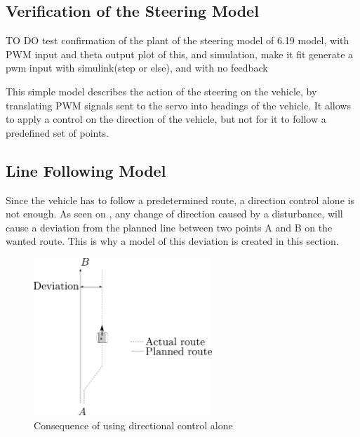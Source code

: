 \subsection{Verification of the Steering Model}

TO DO
test confirmation of the plant of the steering model of 6.19 model, with PWM input and theta output
plot of this, and simulation, make it fit
generate a pwm input with simulink(step or else), and with no feedback

This simple model describes the action of the steering on the vehicle, by translating PWM signals sent to the servo into headings of the vehicle. It allows to apply a control on the direction of the vehicle, but not for it to follow a predefined set of points.

\subsection{Line Following Model}
Since the vehicle has to follow a predetermined route, a direction control alone is not enough. As seen on , any change of direction caused by a disturbance, will cause a deviation from the planned line between two points A and B on the wanted route. This is why a model of this deviation is created in this section.

\begin{figure}[H]
	\centering
	\includegraphics[width=0.6\textwidth]{figures/steeringDeviation.pdf}
	\caption{Consequence of using directional control alone}
	\label{SteeringDeviation}
\end{figure}

